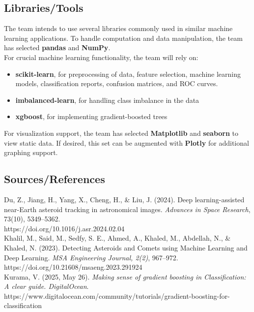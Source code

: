 \documentclass[12pt]{article}
\begin{document}
\subsection*{Libraries/Tools}

The team intends to use several libraries commonly used in similar machine learning applications. To handle computation and data manipulation, the team has selected \textbf{pandas} and \textbf{NumPy}. \\

For crucial machine learning functionality, the team will rely on: 

\begin{itemize}
    \item \textbf{scikit-learn}, for preprocessing of data, feature selection, machine learning models, classification reports, confusion matrices, and ROC curves. 
    \item \textbf{imbalanced-learn}, for handling class imbalance in the data
    \item \textbf{xgboost}, for implementing gradient-boosted trees
\end{itemize}

For visualization support, the team has selected \textbf{Matplotlib} and \textbf{seaborn} to view static data. If desired, this set can be augmented with \textbf{Plotly} for additional graphing support.

\subsection*{Sources/References}
\medskip
Du, Z., Jiang, H., Yang, X., Cheng, H., \& Liu, J. (2024). Deep learning-assisted near-Earth asteroid tracking in astronomical images. \textit{Advances in Space Research}, 73(10), 5349–5362. \\ https://doi.org/10.1016/j.asr.2024.02.04\\

Khalil, M., Said, M., Sedfy, S. E., Ahmed, A., Khaled, M., Abdellah, N., \& Khaled, N. (2023). Detecting Asteroids and Comets using Machine Learning and Deep Learning. \textit{MSA Engineering Journal, 2(2)}, 967–972. \\ https://doi.org/10.21608/msaeng.2023.291924\\

Kurama, V. (2025, May 26). \textit{Making sense of gradient boosting in Classification: A clear guide. DigitalOcean}. https://www.digitalocean.com/community/tutorials/gradient-boosting-for-classification

\medskip
\end{document}
